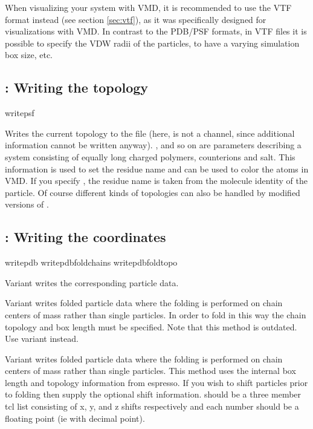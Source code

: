 When visualizing your system with VMD, it is recommended to use the
VTF format instead (see section \ref{sec:vtf}), as it was specifically
designed for visualizations with VMD. In contrast to the PDB/PSF
formats, in VTF files it is possible to specify the VDW radii of the
particles, to have a varying simulation box size, etc.

\subsection{: Writing the topology}

\begin{essyntax}
  writepsf     
   
\end{essyntax}
Writes the current topology to the file  (here, 
is not a channel, since additional information cannot be written
anyway).  ,  and so on are parameters describing a
system consisting of equally long charged polymers, counterions and
salt.  This information is used to set the residue name and can be
used to color the atoms in VMD. If you specify , the
residue name is taken from the molecule identity of the particle. Of
course different kinds of topologies can also be handled by modified
versions of .


\subsection{: Writing the coordinates}

\begin{essyntax}
   writepdb 
   writepdbfoldchains  
    
   writepdbfoldtopo  
\end{essyntax}

Variant  writes the corresponding particle data. 

Variant  writes folded particle data where the folding is
performed on chain centers of mass rather than single particles. In
order to fold in this way the chain topology and box length must be
specified.  Note that this method is outdated. Use variant 
instead.

Variant  writes folded particle data where the folding is
performed on chain centers of mass rather than single particles. This
method uses the internal box length and topology information from
espresso. If you wish to shift particles prior to folding then supply
the optional shift information.  should be a three member
tcl list consisting of x, y, and z shifts respectively and each number
should be a floating point (ie with decimal point).

